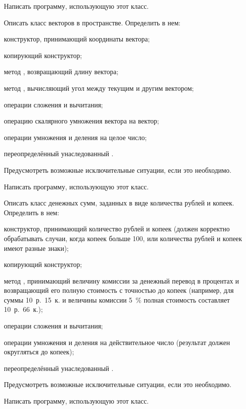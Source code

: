 Написать программу, использующую этот класс.

\task Описать класс  векторов в пространстве. Определить
в нем:
\begin{itemize*}
\item конструктор, принимающий координаты вектора;
\item копирующий конструктор;
\item метод , возвращающий длину вектора;
\item метод , вычисляющий угол между текущим и другим
  вектором;
\item операции сложения и вычитания;
\item операцию скалярного умножения вектора на вектор;
\item операции умножения и деления на целое число;
\item переопределённый унаследованный .
\end{itemize*}

Предусмотреть возможные исключительные ситуации, если это необходимо.

Написать программу, использующую этот класс.

\task Описать класс  денежных сумм, заданных в виде
количества рублей и копеек.  Определить в нем:
\begin{itemize*}
\item конструктор, принимающий количество рублей и копеек (должен
  корректно обрабатывать случаи, когда копеек больше 100, или
  количества рублей и копеек имеют разные знаки);
\item копирующий конструктор;
\item метод , принимающий величину комиссии за
  денежный перевод в процентах и возвращающий его полную стоимость с
  точностью до копеек (например, для суммы 10~р.~15~к. и величины
  комиссии 5~\% полная стоимость составляет 10~р.~66~к.);
\item операции сложения и вычитания;
\item операции умножения и деления на действительное число (результат
  должен округляться до копеек);
\item переопределённый унаследованный .
\end{itemize*}

Предусмотреть возможные исключительные ситуации, если это необходимо.

Написать программу, использующую этот класс.

